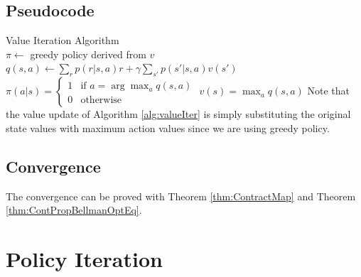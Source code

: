     \subsection{Pseudocode}
        {Value Iteration Algorithm}
        { \\
         }
        {}
        {
            $\pi \leftarrow$ greedy policy derived from $v$\;
            {
                 {
                     {
                        $q(s,a) \leftarrow \sum_r p(r|s,a)r + \gamma \sum_{s'}p(s'|s,a)v(s')$\;
                    }
                    $\pi(a|s)=
                    \begin{cases}
                        1 &\text{if $a = \arg\max_a q(s,a)$} \\
                        0 &\text{otherwise}
                    \end{cases}$\;
                    $v(s) = \max_a{q(s,a)}$\;
                }
            }
        }
        Note that the value update of Algorithm \ref{alg:valueIter} is simply substituting the original state values with
        maximum action values since we are using greedy policy.
    \subsection{Convergence}
        The convergence can be proved with Theorem \ref{thm:ContractMap} and Theorem \ref{thm:ContPropBellmanOptEq}.
\section{Policy Iteration} \label{sec:PolicyIteration}

